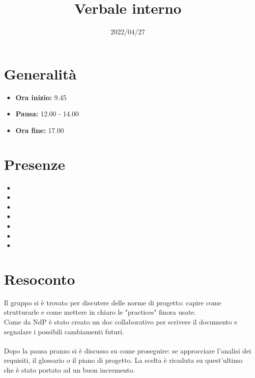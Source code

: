 \documentclass{classes/base}
\title{Verbale interno}
\date{2022/04/27}
\author{\marcob}
\renewcommand{\maketitle}{
    
}
\begin{document}
    \maketitle

    \section*{Generalità}
    \begin{itemize}
        \item \textbf{Ora inizio:} 9.45
        \item  \textbf{Pausa: } 12.00 - 14.00
        \item \textbf{Ora fine:} 17.00
    \end{itemize}

    \section*{Presenze}
    \begin{itemize}
    	\item \angela
    	\item \marcob
        \item \tommaso
     	\item \ruth
      	\item \matteo
        \item \marcov
        \item \giulio
    \end{itemize}

    \section*{Resoconto}
    Il gruppo si è trovato per discutere delle norme di progetto: capire come strutturarle e come mettere in chiaro le "practices" finora usate.\\
    Come da NdP è stato creato un doc collaborativo per scrivere il documento e segnalare i possibili cambiamenti futuri.\\\\
    Dopo la pausa pranzo si è discusso su come proseguire: se approcciare l'analisi dei requisiti, il glossario o il piano di progetto. La scelta è ricaduta su quest'ultimo che è stato portato ad un buon incremento. 
\end{document}
